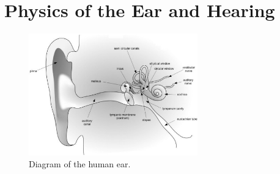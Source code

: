 \section{Physics of the Ear and Hearing}

\begin{center}
\begin{figure}[H]
\includegraphics[width=0.65\textwidth]{../../epsimages/HumanEar-GrayScale.eps}
\caption{Diagram of the human ear. }
\label{Human Ear}
\end{figure}
\end{center}

